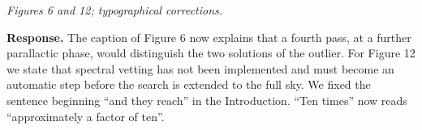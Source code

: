 \documentclass[11pt]{article}
\newenvironment{referee}{\par\color{black!60}\itshape}{\par}
\newcommand{\resp}{\par\noindent\textbf{Response.} }
\begin{document}
\begin{referee}
Figures 6 and 12; typographical corrections.
\end{referee}
\resp The caption of Figure 6 now explains that a fourth pass, at a further parallactic phase, would distinguish the two solutions of the outlier. For Figure 12 we state that spectral vetting has not been implemented and must become an automatic step before the search is extended to the full sky. We fixed the sentence beginning ``and they reach'' in the Introduction. ``Ten times'' now reads ``approximately a factor of ten''.
\end{document}
